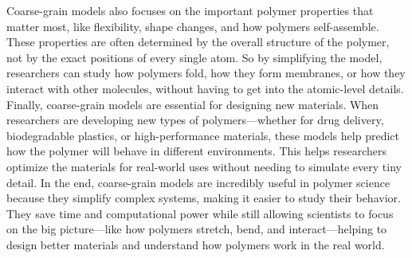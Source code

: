 \documentclass[12pt]{article}
\begin{document}
\begin{flushleft}
	Coarse-grain models also focuses on the important polymer properties that matter most, like flexibility, shape changes, and how polymers self-assemble. These properties are often determined by the overall structure of the polymer, not by the exact positions of every single atom. So by simplifying the model, researchers can study how polymers fold, how they form membranes, or how they interact with other molecules, without having to get into the atomic-level details.\\
	
	Finally, coarse-grain models are essential for designing new materials. When researchers are developing new types of polymers—whether for drug delivery, biodegradable plastics, or high-performance materials, these models help predict how the polymer will behave in different environments. This helps researchers optimize the materials for real-world uses without needing to simulate every tiny detail.
	In the end, coarse-grain models are incredibly useful in polymer science because they simplify complex systems, making it easier to study their behavior. They save time and computational power while still allowing scientists to focus on the big picture—like how polymers stretch, bend, and interact—helping to design better materials and understand how polymers work in the real world.
	

	

\end{flushleft}
\end{document}
